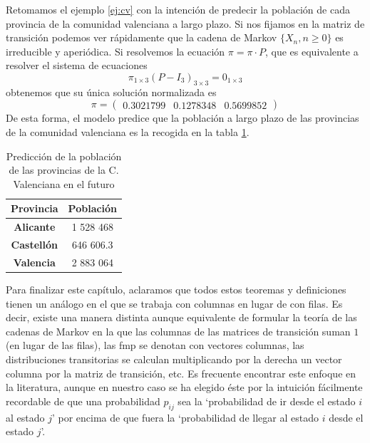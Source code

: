 \begin{ejemplo}
    Retomamos el ejemplo \ref{ej:cv} con la intención de predecir la población de cada provincia de la comunidad valenciana a largo plazo. Si nos fijamos en la matriz de transición podemos ver rápidamente que la cadena de Markov $\{X_n,n\geq 0\}$ es irreducible y aperiódica. Si resolvemos la ecuación $\pi=\pi \cdot P$, que es equivalente a resolver el sistema de ecuaciones 
    \begin{equation*}
        \pi_{1\times 3} (P-I_3)_{3\times 3} = 0_{1\times 3} 
    \end{equation*}
    obtenemos que su única solución normalizada es 
    \begin{equation*}
        \pi = \begin{pmatrix}
            0.3021799 & 0.1278348 & 0.5699852
        \end{pmatrix}
    \end{equation*}
    De esta forma, el modelo predice que la población a largo plazo de las provincias de la comunidad valenciana es la recogida en la tabla \ref{tab:poblacion-largo-plazo}.
    \begin{table}[h]
        \centering
        \begin{tabular}{cc}\hline
            \textbf{Provincia}  & \textbf{Población} \\ \hline\hline
            \textbf{Alicante} &  1 528 468 \\ \hline
            \textbf{Castellón} & 646 606.3 \\ \hline
            \textbf{Valencia} & 2 883 064 \\ \hline
        \end{tabular}
        \caption{Predicción de la población de las provincias de la C. Valenciana en el futuro}
        \label{tab:poblacion-largo-plazo}
    \end{table}
\end{ejemplo}

Para finalizar este capítulo, aclaramos que todos estos teoremas y definiciones tienen un análogo en el que se trabaja con columnas en lugar de con filas. Es decir, existe una manera distinta aunque equivalente de formular la teoría de las cadenas de Markov en la que las columnas de las matrices de transición suman $1$ (en lugar de las filas), las fmp se denotan con vectores columnas, las distribuciones transitorias se calculan multiplicando por la derecha un vector columna por la matriz de transición, etc. Es frecuente encontrar este enfoque en la literatura, aunque en nuestro caso se ha elegido éste por la intuición fácilmente recordable de que una probabilidad $p_{ij}$ sea la `probabilidad de ir desde el estado $i$ al estado $j$' por encima de que fuera la `probabilidad de llegar al estado $i$ desde el estado $j$'. 